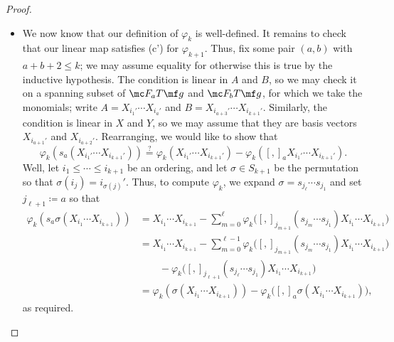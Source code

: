 \documentclass[../notes.tex]{subfiles}
\begin{document}
\begin{proof}
\begin{itemize}
		\item We now know that our definition of $\varphi_k$ is well-defined. It remains to check that our linear map satisfies (c') for $\varphi_{k+1}$. Thus, fix some pair $(a,b)$ with $a+b+2\le k$; we may assume equality for otherwise this is true by the inductive hypothesis. The condition is linear in $A$ and $B$, so we may check it on a spanning subset of $\mc F_aT\mf g$ and $\mc F_bT\mf g$, for which we take the monomials; write $A=X_{i_1'}\cdots X_{i_a'}$ and $B=X_{i_{a+3}'}\cdots X_{i_{k+1}'}$. Similarly, the condition is linear in $X$ and $Y$, so we may assume that they are basis vectors $X_{i_{a+1}'}$ and $X_{i_{a+2}'}$. Rearranging, we would like to show that
		\[\varphi_k(s_a(X_{i_1'}\cdots X_{i_{k+1}'}))\stackrel?=\varphi_k(X_{i_1'}\cdots X_{i_{k+1}'})-\varphi_k([,]_aX_{i_1'}\cdots X_{i_{k+1}'}).\]
		Well, let $i_1\le\cdots\le i_{k+1}$ be an ordering, and let $\sigma\in S_{k+1}$ be the permutation so that $\sigma(i_j)=i_{\sigma(j)}'$. Thus, to compute $\varphi_k$, we expand $\sigma=s_{j_{\ell}}\cdots s_{j_1}$ and set $j_{\ell+1}\coloneqq a$ so that
		\begin{align*}
			\varphi_k(s_a\sigma(X_{i_1}\cdots X_{i_{k+1}})) &= X_{i_1}\cdots X_{i_{k+1}}-\sum_{m=0}^{\ell}\varphi_k\big([,]_{j_{m+1}}(s_{j_m}\cdots s_{j_1})X_{i_1}\cdots X_{i_{k+1}}\big) \\
			&= X_{i_1}\cdots X_{i_{k+1}}-\sum_{m=0}^{\ell-1}\varphi_k\big([,]_{j_{m+1}}(s_{j_m}\cdots s_{j_1})X_{i_1}\cdots X_{i_{k+1}}\big) \\
			&\qquad-\varphi_k\big([,]_{j_{\ell+1}}(s_{j_\ell}\cdots s_{j_1})X_{i_1}\cdots X_{i_{k+1}}\big) \\
			&= \varphi_k(\sigma (X_{i_1}\cdots X_{i_{k+1}}))-\varphi_k\big([,]_{a}\sigma (X_{i_1}\cdots X_{i_{k+1}})\big),
		\end{align*}
		as required.
		\qedhere
	\end{itemize}
\end{proof}
\end{document}
